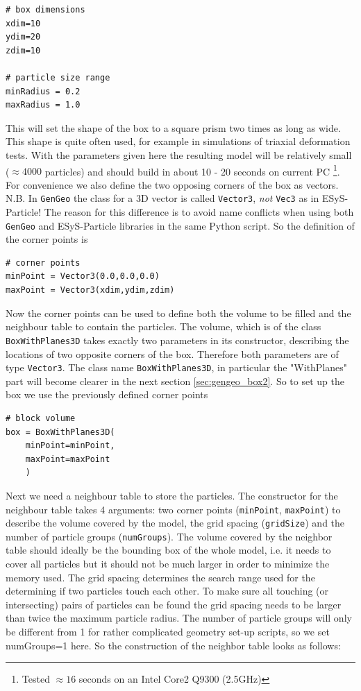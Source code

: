 \begin{verbatim}
# box dimensions
xdim=10
ydim=20
zdim=10

# particle size range
minRadius = 0.2
maxRadius = 1.0
\end{verbatim}
This will set the shape of the box to a square prism two times as long as wide. This shape is quite often used, for example in simulations of triaxial deformation tests. With the parameters given here the resulting model will be relatively small ($\approx 4000$ particles) and should build in about 10 - 20 seconds on current PC \footnote{Tested $\approx 16$ seconds on an Intel Core2 Q9300 (2.5GHz)}. For convenience we also define the two opposing corners of the box as vectors. N.B. In \texttt{GenGeo} the class for a 3D vector is called \texttt{Vector3}, \emph{not} \texttt{Vec3} as in ESyS-Particle! The reason for this difference is to avoid name conflicts when using both \texttt{GenGeo} and ESyS-Particle libraries in the same Python script. So the definition of the corner points is
\begin{verbatim}
# corner points
minPoint = Vector3(0.0,0.0,0.0)
maxPoint = Vector3(xdim,ydim,zdim)
\end{verbatim}
Now the corner points can be used to define both the volume to be filled and the neighbour table to contain the particles. The volume, which is of the class \texttt{BoxWithPlanes3D} takes exactly two parameters in its constructor, describing the locations of two opposite corners of the box. Therefore both parameters are of type \texttt{Vector3}. The class name \texttt{BoxWithPlanes3D}, in particular the "WithPlanes" part will become clearer in the next section \ref{sec:gengeo_box2}.
So to set up the box we use the previously defined corner points
\begin{verbatim}
# block volume
box = BoxWithPlanes3D(
    minPoint=minPoint,
    maxPoint=maxPoint
    )
\end{verbatim}
Next we need a neighbour table to store the particles. The constructor for the neighbour table takes 4 arguments: two corner points (\texttt{minPoint}, \texttt{maxPoint}) to describe the volume covered by the model, the grid spacing (\texttt{gridSize}) and the number of particle groups (\texttt{numGroups}). The volume covered by the neighbor table should ideally be the bounding box of the whole model, i.e. it needs to cover all particles but it should not be much larger in order to minimize the memory used. The grid spacing determines the search range used for the determining if two particles touch each other. To make sure all touching (or intersecting) pairs of particles can be found the grid spacing needs to be larger than twice the maximum particle radius. The number of particle groups will only be different from 1 for rather complicated geometry set-up scripts, so we set numGroups=1 here. So the construction of the neighbor table looks as follows:

